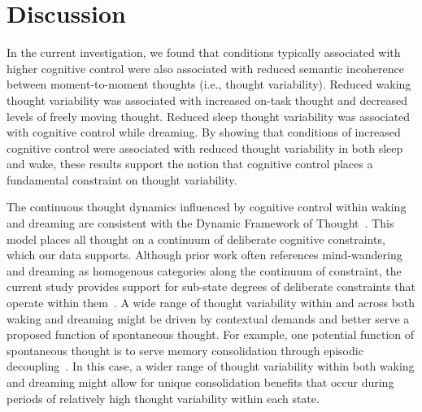 \documentclass[10pt,a4paper,twocolumn]{article}
\begin{document}

\section*{Discussion}

In the current investigation, we found that conditions typically associated with higher cognitive control were also associated with reduced semantic incoherence between moment-to-moment thoughts (i.e., thought variability). Reduced waking thought variability was associated with increased on-task thought and decreased levels of freely moving thought. Reduced sleep thought variability was associated with cognitive control while dreaming. By showing that conditions of increased cognitive control were associated with reduced thought variability in both sleep and wake, these results support the notion that cognitive control places a fundamental constraint on thought variability.

\par
The continuous thought dynamics influenced by cognitive control within waking and dreaming are consistent with the Dynamic Framework of Thought~\cite{christoff2016}. This model places all thought on a continuum of deliberate cognitive constraints, which our data supports. Although prior work often references mind-wandering and dreaming as homogenous categories along the continuum of constraint, the current study provides support for sub-state degrees of deliberate constraints that operate within them~\cite{mallett2021}. A wide range of thought variability within and across both waking and dreaming might be driven by contextual demands and better serve a proposed function of spontaneous thought. For example, one potential function of spontaneous thought is to serve memory consolidation through episodic decoupling~\cite{mildner2019,mills2018}. In this case, a wider range of thought variability within both waking and dreaming might allow for unique consolidation benefits that occur during periods of relatively high thought variability within each state.
\end{document}
